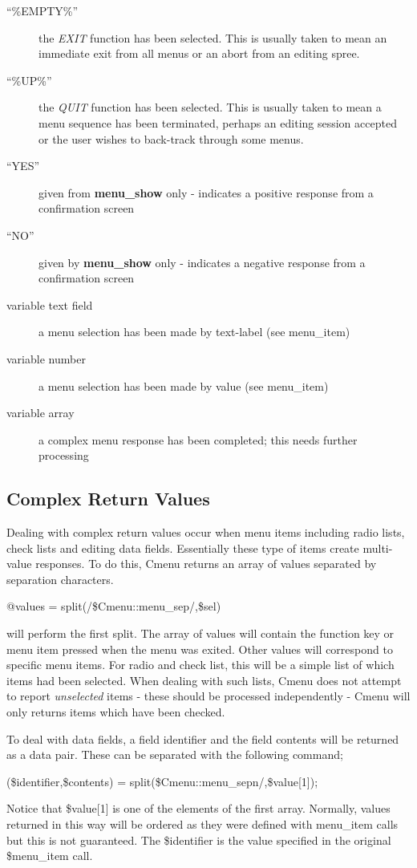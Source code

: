 \documentclass[a4paper]{scrartcl}
\begin{document}
\begin{description}
\item [``\%EMPTY\%''] the \textit{EXIT} function has been selected. This is usually taken to mean an immediate exit from all menus or an abort from an editing spree.
\item [``\%UP\%''] the \textit{QUIT} function has been selected. This is usually taken to mean a menu sequence has been terminated, perhaps an editing session accepted or the user wishes to back-track through some menus.
\item [``YES''] given from \textbf{menu\_show} only - indicates a positive response from a confirmation screen
\item [``NO''] given by \textbf{menu\_show} only - indicates a negative response from a confirmation screen
\item [variable text field] a menu selection has been made by text-label (see menu\_item)
\item [variable number] a menu selection has been made by value (see menu\_item)
\item [variable array] a complex menu response has been completed; this needs further processing
\end{description}

\subsection{Complex Return Values}
Dealing with complex return values occur when menu items including radio lists, check lists and editing data fields. Essentially these type of items create multi-value responses. To do this, Cmenu returns an array of values separated by separation characters. 
\begin{center}
@values = split(/\$Cmenu::menu\_sep/,\$sel)
\end{center}
will perform the first split. The array of values will contain the function key or menu item pressed when the menu was exited. Other values will correspond to specific menu items. For radio and check list, this will be a simple list of which items had been selected. When dealing with such lists, Cmenu does not attempt to report \textit{unselected} items - these should be processed independently - Cmenu will only returns items which have been checked.

To deal with data fields, a field identifier and the field contents will be returned as a data pair. These can be separated with the following command;
\begin{center}
(\$identifier,\$contents) = split(\$Cmenu::menu\_sepn/,\$value[1]);
\end{center}
Notice that \$value[1] is one of the elements of the first array. Normally, values returned in this way will be ordered as they were defined with menu\_item calls but this is not guaranteed. The \$identifier is the value specified in the original \$menu\_item call.
\end{document}
